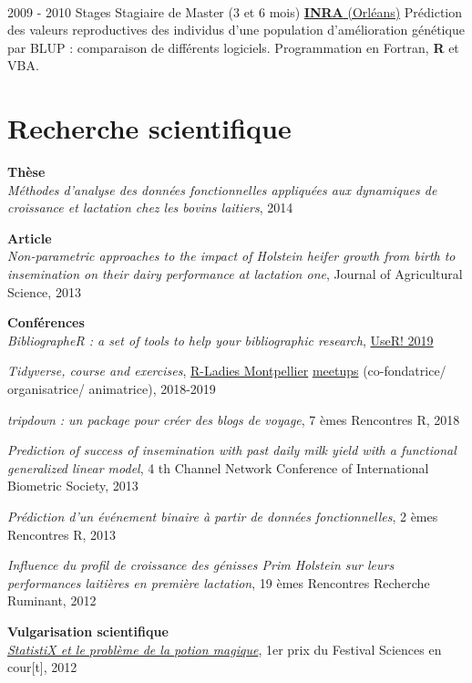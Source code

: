 \documentclass[letterpaper]{twentysecondcv} %
\begin{document}
\begin{twenty}
{        }
     \\
     \twentyitem
   		{2009 - 2010}
		{Stages}
        {Stagiaire de Master \textnormal{(3 et 6 mois)}}
        {\href{https://www6.val-de-loire.inra.fr/biofora}{\textbf{INRA} (Orléans)}}
        {}
        {Prédiction des valeurs reproductives des individus d’une population d’amélioration génétique par BLUP : comparaison de différents logiciels. Programmation en Fortran, \textbf{R} et VBA.
    	}
        
\end{twenty}

\vspace{5mm} 

\section{Recherche scientifique}
\textbf{Thèse} \\ 
\textit{Méthodes d'analyse des données fonctionnelles appliquées aux dynamiques de croissance et lactation chez les bovins laitiers}, 2014

\textbf{Article} \\ 
\textit{Non-parametric approaches to the impact of Holstein heifer growth from birth to insemination on their dairy performance at lactation one}, Journal of Agricultural Science,  2013 

\textbf{Conférences} \\ 

\textit{BibliographeR : a set of tools to help your bibliographic research}, \href{http://www.user2019.fr/talk_schedule/}{UseR! 2019} 

\textit{Tidyverse, course and exercises}, \href{https://twitter.com/RLadiesMontpel}{R-Ladies Montpellier} \href{https://www.meetup.com/fr-FR/rladies-montpellier/}{meetups} (co-fondatrice/ organisatrice/ animatrice), 2018-2019

\textit{tripdown : un package pour créer des blogs de voyage}, 7 èmes Rencontres R, 2018

\textit{Prediction of success of insemination with past daily milk yield with a functional generalized linear model}, 4 th Channel Network Conference of International Biometric Society, 2013

\textit{Prédiction d'un événement binaire à partir de données fonctionnelles}, 2 èmes Rencontres R, 2013

\textit{Influence du profil de croissance des génisses Prim Holstein sur leurs performances laitières en première
lactation}, 19 èmes Rencontres Recherche Ruminant, 2012 

\textbf{Vulgarisation scientifique}\\
\href{https://www.youtube.com/watch?v=QAT0F__A258}{\textit{StatistiX et le problème de la potion magique}}, 1er prix du Festival Sciences en cour[t], 2012
\end{document}
